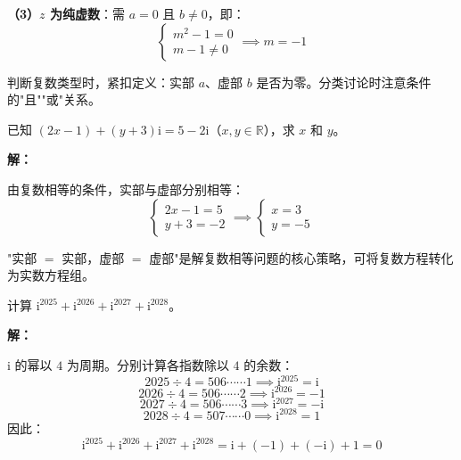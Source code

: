 \documentclass[12pt, a4paper]{ctexart}
\begin{document}
\textbf{（3）$z$ 为纯虚数}：需 $a = 0$ 且 $b \neq 0$，即：
\[
  \begin{cases}
    m^2 - 1 = 0 \\[4pt]
    m - 1 \neq 0
  \end{cases}
  \implies m = -1
\]

\begin{tipbox}[方法总结]
判断复数类型时，紧扣定义：实部 $a$、虚部 $b$ 是否为零。分类讨论时注意条件的"且""或"关系。
\end{tipbox}

\vspace{6pt}

\begin{examplebox}[【例题2】复数相等求参数]
已知 $(2x - 1) + (y + 3)\mathrm{i} = 5 - 2\mathrm{i}$（$x, y \in \mathbb{R}$），求 $x$ 和 $y$。
\end{examplebox}

\textbf{解：}

由复数相等的条件，实部与虚部分别相等：
\[
  \begin{cases}
    2x - 1 = 5 \\[4pt]
    y + 3 = -2
  \end{cases}
  \implies
  \begin{cases}
    x = 3 \\[4pt]
    y = -5
  \end{cases}
\]

\begin{tipbox}[方法总结]
"实部 $=$ 实部，虚部 $=$ 虚部"是解复数相等问题的核心策略，可将复数方程转化为实数方程组。
\end{tipbox}

\vspace{6pt}

\begin{examplebox}
计算 $\mathrm{i}^{2025} + \mathrm{i}^{2026} + \mathrm{i}^{2027} + \mathrm{i}^{2028}$。
\end{examplebox}

\textbf{解：}

$\mathrm{i}$ 的幂以 $4$ 为周期。分别计算各指数除以 $4$ 的余数：
\[
  2025 \div 4 = 506 \cdots\cdots 1 \implies \mathrm{i}^{2025} = \mathrm{i}
\]
\[
  2026 \div 4 = 506 \cdots\cdots 2 \implies \mathrm{i}^{2026} = -1
\]
\[
  2027 \div 4 = 506 \cdots\cdots 3 \implies \mathrm{i}^{2027} = -\mathrm{i}
\]
\[
  2028 \div 4 = 507 \cdots\cdots 0 \implies \mathrm{i}^{2028} = 1
\]
因此：
\[
  \mathrm{i}^{2025} + \mathrm{i}^{2026} + \mathrm{i}^{2027} + \mathrm{i}^{2028}
  = \mathrm{i} + (-1) + (-\mathrm{i}) + 1 = 0
\]
\end{document}

